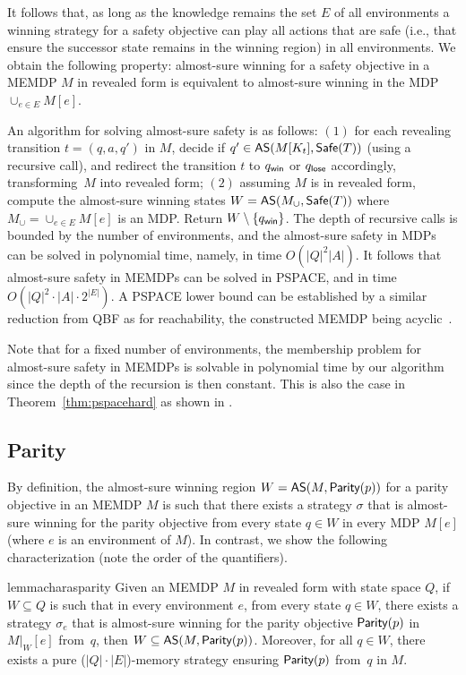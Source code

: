 \documentclass[a4paper,USenglish,cleveref, autoref, thm-restate]{lipics-v2021}
\def\abs#1{\ensuremath{\lvert #1 \rvert}}
\newcommand\restr[2]{\ensuremath{\left.#1\right\rvert_{#2}}}
\newcommand\almostsure{\textrm{\sf AS}}
\newcommand\Safe{\textrm{\sf Safe}}
\newcommand\Parity{\textrm{\sf Parity}}
\def\loseabsorb{q_{\sf lose}}
\def\winabsorb{q_{\sf win}}
\begin{document}
It follows that, as long as the knowledge remains the set $E$ of all environments
a winning strategy for a safety objective can play all actions that 
are safe (i.e., that ensure the successor state remains in the winning region) 
in all environments. We obtain the following property:
almost-sure winning for a safety objective in a MEMDP $M$ in revealed form
is equivalent to almost-sure winning in the MDP $\cup_{e \in E} M[e]$.

An algorithm for solving almost-sure safety is as follows: 
$(1)$ for each revealing transition $t=(q,a,q')$ in $M$, 
decide if $q' \in \almostsure(M[K_t], \Safe(T))$ (using a recursive call),
and redirect the transition $t$ to $\winabsorb$ or $\loseabsorb$ accordingly,
transforming~$M$ into revealed form;
$(2)$ assuming $M$ is in revealed form, compute the almost-sure winning 
states $W = \almostsure(M_{\cup}, \Safe(T))$ where $M_{\cup} = \cup_{e \in E} M[e]$
is an MDP. Return $W \setminus \{\winabsorb\}$. The depth of recursive calls
is bounded by the number of environments, and the almost-sure safety in MDPs 
can be solved in polynomial time,
namely, in time $O(\abs{Q}^2\abs{A})$.
It follows that almost-sure safety in MEMDPs can be solved in PSPACE,
and in time $O(\abs{Q}^2\cdot\abs{A}\cdot 2^{\abs{E}})$.
A PSPACE lower bound can be established by a similar reduction from QBF 
as for reachability, the constructed MEMDP being acyclic~\cite{vdVJJ23}.

Note that for a fixed number of environments, the membership problem for almost-sure 
safety in MEMDPs is solvable in polynomial time by our algorithm
since the depth of the recursion is then constant.
This is also the case in Theorem~\ref{thm:pspacehard}
as shown in \cite{vdVJJ23}.


\subsection{Parity}\label{section:as-parity}
By definition, the almost-sure winning region $W = \almostsure(M, \Parity(p))$ 
for a parity objective in an MEMDP $M$ is such that there exists a strategy $\sigma$
that is almost-sure winning for the parity objective from every state $q \in W$
in every MDP $M[e]$ (where $e$ is an environment of $M$).  
In contrast, we show the following characterization (note the order of the quantifiers).

\begin{restatable}{lemma}{charasparity} \label{lem:char-as-parity}
	Given an MEMDP $M$ in revealed form with state space $Q$, if $W \subseteq Q$ is such that 
	in every environment $e$, 
	from every state $q\in W$, there exists a strategy $\sigma_e$
	that is almost-sure winning for the parity objective $\Parity(p)$ in $\restr{M}{W}[e]$ from~$q$,
	then $W \subseteq \almostsure(M, \Parity(p))$.
	Moreover, for all $q \in W$, there exists a pure ($\abs{Q}\cdot\abs{E}$)-memory strategy ensuring
	$\Parity(p)$ from~$q$ in $M$.
\end{restatable}
\end{document}
